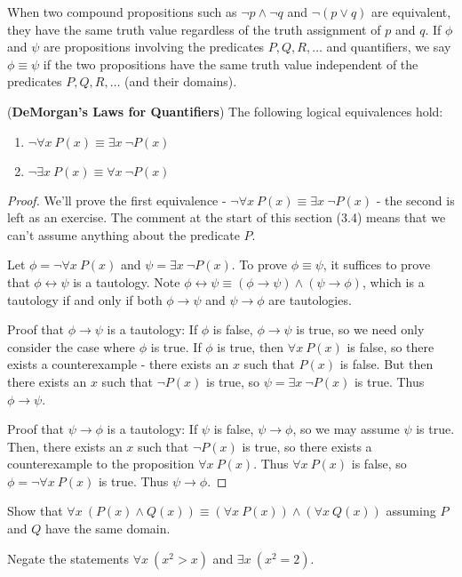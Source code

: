When two compound propositions such as $\neg p\wedge \neg q$ and 
$\neg(p\vee q)$ are equivalent, they have the same truth value 
regardless of the truth assignment of $p$ and $q$. 
If $\phi$ and $\psi$ are propositions involving the predicates $P,Q,R,\dots$ and quantifiers, 
we say $\phi\equiv\psi$ if the two propositions have the same truth value 
independent of the predicates $P,Q,R,\dots$ (and their domains).

\example (\textbf{DeMorgan's Laws for Quantifiers}) The following logical equivalences hold:
\begin{enumerate}
  \item $\neg\forall x\:P(x)\equiv \exists x\:\neg P(x)$
  \item $\neg\exists x\:P(x)\equiv \forall x\:\neg P(x)$
\end{enumerate}
\begin{proof}
  We'll prove the first equivalence - $\neg\forall x\:P(x)\equiv \exists x\:\neg P(x)$ 
  - the second is left as an exercise. 
  The comment at the start of this section (3.4) means that 
  we can't assume anything about the predicate $P$.

  Let $\phi=\neg\forall x\:P(x)$ and $\psi=\exists x\:\neg P(x)$.
  To prove $\phi\equiv\psi$, it suffices to prove that
  $\phi\leftrightarrow\psi$ is a tautology. 
  Note $\phi\leftrightarrow\psi\equiv(\phi\rightarrow\psi)\wedge(\psi\rightarrow\phi)$,
  which is a tautology if and only if both $\phi\rightarrow\psi$ and $\psi\rightarrow\phi$
  are tautologies.

  Proof that $\phi\rightarrow\psi$ is a tautology: If $\phi$ is false,
  $\phi\rightarrow\psi$ is true, so we need only consider the case where $\phi$ is true.
  If $\phi$ is true, then $\forall x\:P(x)$ is false, so there exists a counterexample -
  there exists an $x$ such that $P(x)$ is false. But then there exists an $x$ such that
  $\neg P(x)$ is true, so $\psi=\exists x\:\neg P(x)$ is true. Thus $\phi\rightarrow\psi$.

  Proof that $\psi\rightarrow\phi$ is a tautology: If $\psi$ is false,
  $\psi\rightarrow\phi$, so we may assume $\psi$ is true.
  Then, there exists an $x$ such that $\neg P(x)$ is true, so there exists
  a counterexample to the proposition $\forall x\:P(x)$. Thus $\forall x\:P(x)$ is false,
  so $\phi=\neg\forall x\:P(x)$ is true. Thus $\psi\rightarrow\phi$.
\end{proof}

\example Show that $\forall x\:(P(x)\wedge Q(x))\equiv (\forall x\:P(x))\wedge(\forall x\:Q(x))$
  assuming $P$ and $Q$ have the same domain.
  
\example Negate the statements $\forall x\:(x^2>x)$ and $\exists x\:(x^2=2)$.
